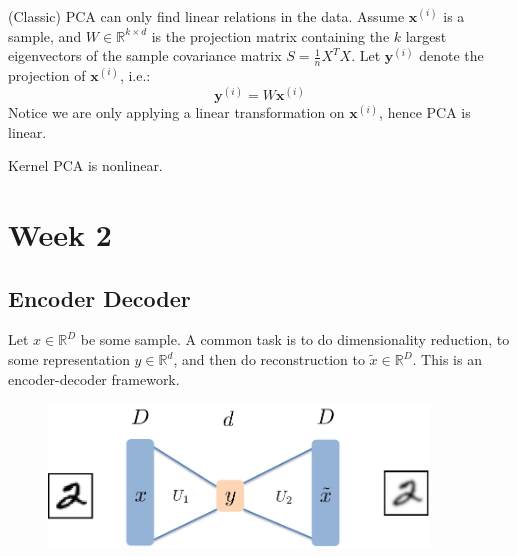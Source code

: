 \documentclass{article}
\begin{document}
\begin{remark} (Classic) PCA can only find linear relations in the data. Assume $\bm{x}^{(i)}$ is a sample, and $W \in \mathbb{R}^{k \times d}$ is the projection matrix containing the  $k$ largest eigenvectors of the sample covariance matrix $S = \frac{1}{n} X^T X$. Let $\bm{y}^{(i)}$ denote the projection of $\bm{x}^{(i)}$, i.e.:
\[
  \bm{y}^{(i)} = W \bm{x}^{(i)} 
  \]
Notice we are only applying a linear transformation on $\bm{x}^{(i)}$, hence PCA is linear.

Kernel PCA is nonlinear. 
\end{remark}



\section{Week 2}
\subsection{Encoder Decoder}
Let $x \in \mathbb{R}^{D}$ be some sample. A common task is to do dimensionality reduction,  to some representation $y \in \mathbb{R}^{d}$, and then do reconstruction to $\widetilde{x} \in \mathbb{R}^{D}$. This is an encoder-decoder framework. 
\begin{figure}[H] \centering \includegraphics[height=0.3\textheight,width=0.9\textwidth,keepaspectratio]{encoderDecoder}  \label{fig:encoderDecoder} \end{figure}
\end{document}
